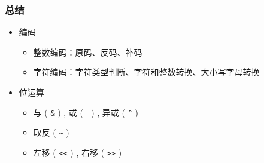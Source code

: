 \begin{frame}[fragile]
    \frametitle{总结}

    \begin{itemize}
        \item<1-> 编码
        
        \begin{itemize}
            \item 整数编码：原码、反码、补码
            \item 字符编码：字符类型判断、字符和整数转换、大小写字母转换
        \end{itemize}

        \item<2-> 位运算
        
        \begin{itemize}
            \item 与 ( \lstinline|&| ) , 或 ( | ) , 异或 ( \lstinline|^| )
            \item 取反 ( \lstinline|~| ) 
            \item 左移 ( \lstinline|<<| ) , 右移 ( \lstinline|>>| )
        \end{itemize}

    \end{itemize}

\end{frame}

